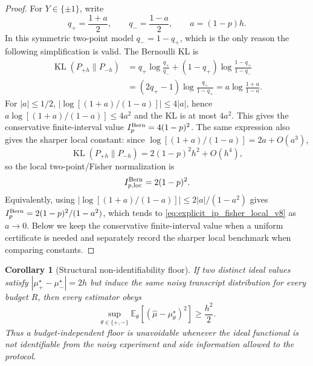 \documentclass[11pt]{article}
\newtheorem{corollary}{Corollary}
\DeclareMathOperator{\KL}{KL}
\newcommand{\1}{\mathbf{1}}
\newcommand{\abs}[1]{\left\lvert #1 \right\rvert}
\begin{document}
\begin{proof}
For \(Y\in\{\pm1\}\), write
\begin{equation}
    q_+=\frac{1+a}{2},\qquad q_-=\frac{1-a}{2},\qquad a=(1-p)h.
\end{equation}
In this symmetric two-point model \(q_-=1-q_+\), which is the only reason the following simplification is valid.  The Bernoulli KL is
\begin{align}
    \KL(P_{+h}\|P_{-h})
    &=q_+\log\frac{q_+}{q_-}+(1-q_+)\log\frac{1-q_+}{1-q_-}\\
    &=(2q_+-1)\log\frac{q_+}{1-q_+}
      =a\log\frac{1+a}{1-a}.
      \label{eq:bernoulli_kl_corrected_v9}
\end{align}
For \(\abs a\le1/2\), \(\left|\log[(1+a)/(1-a)]\right|\le4\abs a\), hence \(a\log[(1+a)/(1-a)]\le4a^2\) and the KL is at most \(4a^2\).  This gives the conservative finite-interval value \(I_p^{\rm Bern}=4(1-p)^2\).  The same expression also gives the sharper local constant: since \(\log[(1+a)/(1-a)]=2a+O(a^3)\),
\begin{equation}
    \KL(P_{+h}\|P_{-h})=2(1-p)^2h^2+O(h^4),
\end{equation}
so the local two-point/Fisher normalization is
\begin{equation}
    I_{p,\mathrm{loc}}^{\rm Bern}=2(1-p)^2.
    \label{eq:explicit_ip_fisher_local_v8}
\end{equation}
Equivalently, using \(\left|\log[(1+a)/(1-a)]\right|\le2\abs a/(1-a^2)\) gives \(I_p^{\rm Bern}=2(1-p)^2/(1-a^2)\), which tends to \cref{eq:explicit_ip_fisher_local_v8} as \(a\to0\).  Below we keep the conservative finite-interval value when a uniform certificate is needed and separately record the sharper local benchmark when comparing constants.
\end{proof}

\begin{corollary}[Structural non-identifiability floor]
\label{cor:nonidentifiability_floor}
If two distinct ideal values satisfy \(\abs{\mu_+^\star-\mu_-^\star}=2h\) but induce the same noisy transcript distribution for every budget \(R\), then every estimator obeys
\begin{equation}
    \sup_{\theta\in\{+,-\}}
    \mathbb E_\theta\left[(\widehat\mu-\mu_\theta^\star)^2\right]
    \geq \frac{h^2}{2}.
\end{equation}
Thus a budget-independent floor is unavoidable whenever the ideal functional is not identifiable from the noisy experiment and side information allowed to the protocol.
\end{corollary}
\end{document}
